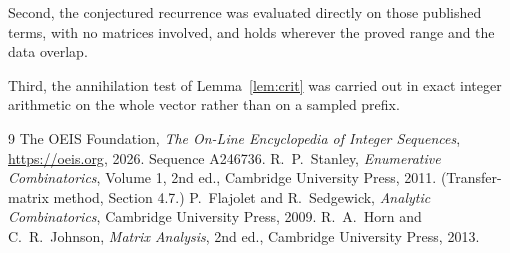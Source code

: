 \documentclass[11pt,a4paper]{article}
\theoremstyle{plain}
\theoremstyle{definition}
\begin{document}
Second, the conjectured recurrence was evaluated directly on those published terms, with no
matrices involved, and holds wherever the proved range and the data overlap.

Third, the annihilation test of Lemma~\ref{lem:crit} was carried out in exact integer
arithmetic on the whole vector rather than on a sampled prefix.

\begin{thebibliography}{9}
 The OEIS Foundation, \emph{The On-Line Encyclopedia of Integer
Sequences}, \url{https://oeis.org}, 2026. Sequence A246736.
 R.~P.~Stanley, \emph{Enumerative Combinatorics}, Volume 1, 2nd ed.,
Cambridge University Press, 2011. (Transfer-matrix method, Section 4.7.)
 P.~Flajolet and R.~Sedgewick, \emph{Analytic Combinatorics}, Cambridge
University Press, 2009.
 R.~A.~Horn and C.~R.~Johnson, \emph{Matrix Analysis}, 2nd ed., Cambridge
University Press, 2013.
\end{thebibliography}
\end{document}
